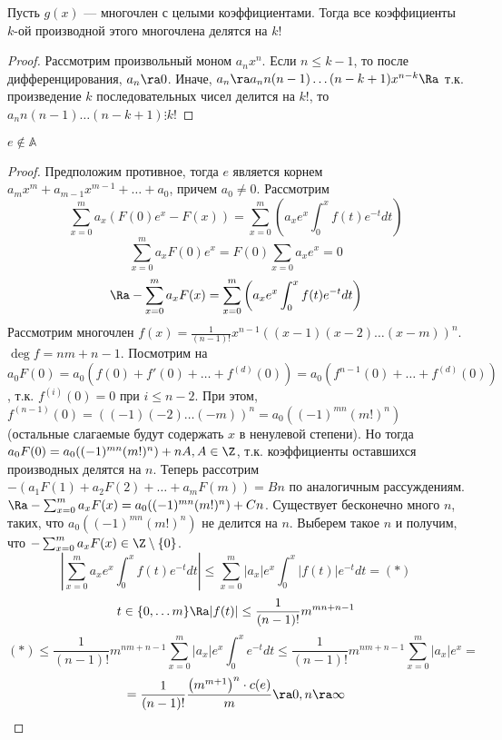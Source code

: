 \begin{proposition}
    Пусть \(g(x)\) --- многочлен с целыми коэффициентами. Тогда все коэффициенты \(k\)-ой производной этого многочлена делятся на \(k!\)
\end{proposition}
\begin{proof}
    Рассмотрим произвольный моном \(a_nx^n\). Если \(n \le k - 1\), то после дифференцирования, \(a_n \ra 0\). Иначе, \(a_n \ra a_nn(n - 1)\dots(n - k + 1)x^{n - k} \Ra\) т.к. произведение \(k\) последовательных чисел делится на \(k!\), то \(a_nn(n - 1)\dots(n - k + 1) \vdots k!\)
\end{proof}

\begin{theorem}
    \(e \notin \mathbb{A}\)
\end{theorem}
\begin{proof}
    Предположим противное, тогда \(e\) является корнем \(a_mx^m + a_{m - 1}x^{m - 1} + \dots + a_0\), причем \(a_0 \ne 0\).
    Рассмотрим 
    \[\sum_{x = 0}^m a_x(F(0)e^x - F(x)) = \sum_{x = 0}^m\left(a_xe^x\int_0^x f(t)e^{-t}dt\right)\]
    \[\sum_{x = 0}^ma_xF(0)e^x = F(0)\sum_{x = 0}a_xe^x = 0\]
    \[\Ra -\sum_{x = 0}^m a_xF(x) = \sum_{x = 0}^m\left(a_xe^x\int_0^xf(t)e^{-t}dt\right)\]
    Рассмотрим многочлен \(f(x) = \frac{1}{(n - 1)!}x^{n - 1}((x - 1)(x - 2)\dots(x - m))^n\). \(\deg f = nm + n - 1\). Посмотрим на \(a_0F(0) = a_0\left(f(0) + f'(0) + \dots + f^{(d)}(0)\right) = a_0\left(f^{n-1}(0) + \dots + f^{(d)}(0)\right)\), т.к. \(f^{(i)}(0) = 0\) при \(i \le n - 2\). При этом, \(f^{(n - 1)}(0) = ((-1)(-2)\dots(-m))^n = a_0((-1)^{mn} (m!)^n)\) (остальные слагаемые будут содержать \(x\) в ненулевой степени). Но тогда \(a_0F(0) = a_0((-1)^{mn} (m!)^n) + nA, A \in \Z\), т.к. коэффициенты оставшихся производных делятся на \(n\).
    Теперь рассотрим \(-(a_1F(1) + a_2F(2) + \dots + a_mF(m)) = Bn\) по аналогичным рассуждениям. \(\Ra -\sum_{x = 0}^m a_xF(x) = a_0((-1)^{mn} (m!)^n) + Cn\). Существует бесконечно много \(n\), таких, что \(a_0((-1)^{mn} (m!)^n)\) не делится на \(n\). Выберем такое \(n\) и получим, что \(-\sum_{x = 0}^m a_xF(x) \in \Z \setminus \{0\}\). 
    \[\left|\sum_{x = 0}^m a_xe^x\int_0^xf(t)e^{-t}dt\right| \le \sum_{x = 0}^m |a_x|e^x\int_0^x|f(t)|e^{-t}dt = (*)\]
    \[t \in \{0, \dots m\} \Ra |f(t)| \le \frac{1}{(n - 1)!}m^{mn + n - 1}\]
    \[(*) \le \frac{1}{(n - 1)!}m^{nm + n - 1}\sum_{x = 0}^m|a_x|e^x\int_0^xe^{-t}dt \le \frac{1}{(n - 1)!}m^{nm + n - 1}\sum_{x = 0}^m|a_x|e^x = \]
    \[ = \frac{1}{(n - 1)!}\frac{\left(m^{m + 1}\right)^n \cdot c(e)}{m} \ra 0, n \ra \infty\]
\end{proof}
